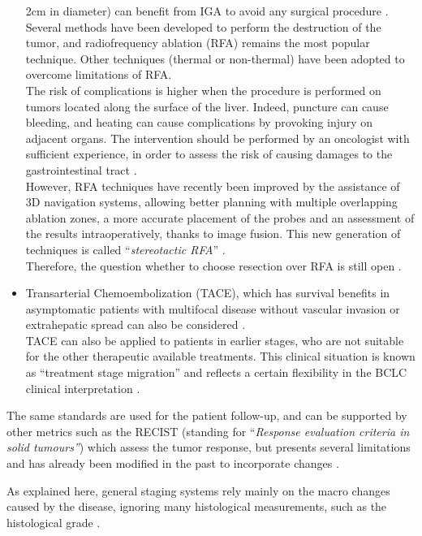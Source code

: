 \begin{itemize}
  2cm in diameter) can benefit from IGA to avoid any surgical
  procedure \cite{Forner2012}.\\
  Several methods have been developed to perform the destruction of the
  tumor, and radiofrequency ablation (RFA) remains the most
  popular technique. Other techniques (thermal or non-thermal) have been
  adopted to overcome limitations of RFA.\\
  The risk of complications is higher when the procedure is performed on
  tumors located along the surface of the liver. Indeed, puncture can
  cause bleeding, and heating can cause complications by provoking
  injury on adjacent organs. The intervention should be performed by an
  oncologist with sufficient experience, in order to assess the risk of
  causing damages to the gastrointestinal tract \cite{Breen2015}.\\
  However, RFA techniques have recently been improved by the
  assistance of 3D navigation systems, allowing better planning with
  multiple overlapping ablation zones, a more accurate placement of the
  probes and an assessment of the results intraoperatively, thanks to
  image fusion. This new generation of techniques is called
  ``\emph{stereotactic RFA}'' \cite{Perrodin2019,Bale2019,Laimer2020}.\\
  Therefore, the question whether to choose resection over RFA is
  still open \cite{Heimbach2018,Bale2019}.
\item Transarterial Chemoembolization (TACE), which has survival
  benefits in asymptomatic patients with multifocal disease without
  vascular invasion or extrahepatic spread can also be considered \cite{Forner2018}.\\
  TACE can also be applied to patients in earlier stages, who are
  not suitable for the other therapeutic available treatments. This
  clinical situation is known as ``treatment stage migration'' and
  reflects a certain flexibility in the BCLC clinical
  interpretation \cite{Burrel2012}.
\end{itemize}

The same standards are used for the patient follow-up, and can be
supported by other metrics such as the RECIST (standing for
``\emph{Response evaluation criteria in solid tumours''}) which assess
the tumor response, but presents several limitations and has already
been modified in the past to incorporate changes \cite{Eisenhauer2008}.

As explained here, general staging systems rely mainly on the macro
changes caused by the disease, ignoring many histological measurements,
such as the histological grade \cite{EdmondsonHA1954}.


